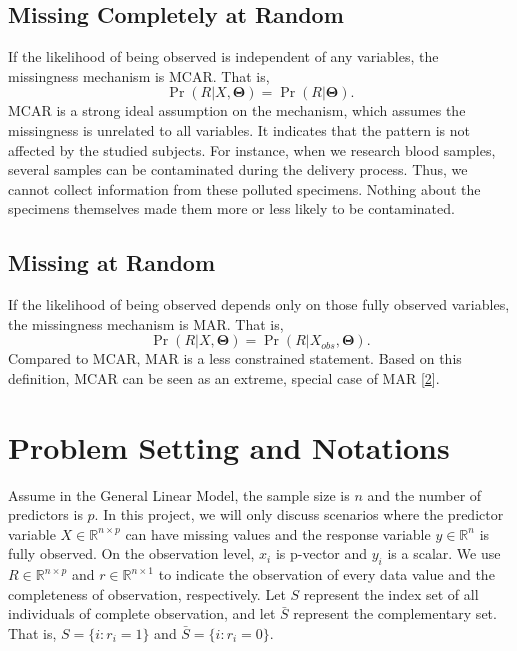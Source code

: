 \documentclass[
  twocolumn]{article}
\begin{document}
\hypertarget{missing-completely-at-random}{%
\subsection{Missing Completely at
Random}\label{missing-completely-at-random}}

If the likelihood of being observed is independent of any variables, the
missingness mechanism is MCAR. That is, \[
\Pr(R|X, \boldsymbol\Theta) = \Pr(R| \boldsymbol\Theta).
\] MCAR is a strong ideal assumption on the mechanism, which assumes the
missingness is unrelated to all variables. It indicates that the pattern
is not affected by the studied subjects. For instance, when we research
blood samples, several samples can be contaminated during the delivery
process. Thus, we cannot collect information from these polluted
specimens. Nothing about the specimens themselves made them more or less
likely to be contaminated.

\hypertarget{missing-at-random}{%
\subsection{Missing at Random}\label{missing-at-random}}

If the likelihood of being observed depends only on those fully observed
variables, the missingness mechanism is MAR. That is, \[
\Pr(R|X, \boldsymbol\Theta) = \Pr(R|X_{obs}, \boldsymbol\Theta).
\] Compared to MCAR, MAR is a less constrained statement. Based on this
definition, MCAR can be seen as an extreme, special case of MAR
{[}\protect\hyperlink{ref-schafer2002missing}{2}{]}.

\hypertarget{problem-setting-and-notations}{%
\section{Problem Setting and
Notations}\label{problem-setting-and-notations}}

Assume in the General Linear Model, the sample size is \(n\) and the
number of predictors is \(p\). In this project, we will only discuss
scenarios where the predictor variable \(X \in \mathbb{R}^{n \times p}\)
can have missing values and the response variable \(y \in \mathbb{R}^n\)
is fully observed. On the observation level, \(x_i\) is p-vector and
\(y_i\) is a scalar. We use \(R \in \mathbb{R}^{n \times p}\) and
\(r \in \mathbb{R}^{n \times 1}\) to indicate the observation of every
data value and the completeness of observation, respectively. Let \(S\)
represent the index set of all individuals of complete observation, and
let \(\bar{S}\) represent the complementary set. That is,
\(S = \{i: r_i = 1\}\) and \(\bar{S} = \{i: r_i = 0\}\).
\end{document}
